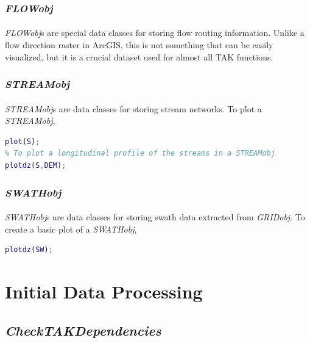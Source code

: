\subsubsection{\textit{FLOWobj}}
\paragraph{}\textit{FLOWobj}s are special data classes for storing flow routing information. Unlike a flow direction raster in ArcGIS, this is not something that can be easily visualized, but it is a crucial dataset used for almost all TAK functions. 

\subsubsection{\textit{STREAMobj}}
\paragraph{}\textit{STREAMobj}s are data classes for storing stream networks. To plot a \textit{STREAMobj},

\begin{lstlisting}[language=Matlab]
%To plot a map of a STREAMobj
plot(S);
% To plot a longitudinal profile of the streams in a STREAMobj
plotdz(S,DEM);
\end{lstlisting}

\subsubsection{\textit{SWATHobj}}
\paragraph{}\textit{SWATHobj}s are data classes for storing swath data extracted from \textit{GRIDobj}. To create a basic plot of a \textit{SWATHobj},

\begin{lstlisting}[language=Matlab]
%To plot swath profile of a SWATHobj 
plotdz(SW);
\end{lstlisting}

\section{Initial Data Processing} \label{sec:idp}

\subsection{\textit{CheckTAKDependencies}} \label{sec:Depend}
